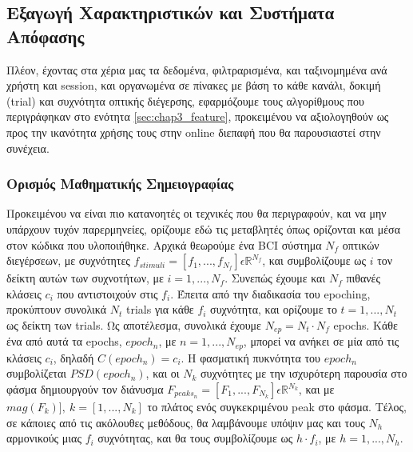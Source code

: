 \documentclass[11pt,a4paper,english,greek,twoside]{../Thesis}
\begin{document}
\subsection{Εξαγωγή Χαρακτηριστικών και Συστήματα Απόφασης}
\label{subsec:featureExtract}
\par Πλέον, έχοντας στα χέρια μας τα δεδομένα, φιλτραρισμένα, και ταξινομημένα ανά χρήστη και session, και οργανωμένα σε πίνακες με βάση το κάθε κανάλι, δοκιμή (trial) και συχνότητα οπτικής διέγερσης, εφαρμόζουμε τους αλγορίθμους που περιγράφηκαν στο ενότητα \ref{sec:chap3_feature}, προκειμένου να αξιολογηθούν ως προς την ικανότητα χρήσης τους στην online διεπαφή που θα παρουσιαστεί στην συνέχεια.

\subsubsection{Ορισμός Μαθηματικής Σημειογραφίας}
\par Προκειμένου να είναι πιο κατανοητές οι τεχνικές που θα περιγραφούν, και να μην υπάρχουν τυχόν παρερμηνείες, ορίζουμε εδώ τις μεταβλητές όπως ορίζονται και μέσα στον κώδικα που υλοποιήθηκε. Αρχικά θεωρούμε ένα BCI σύστημα $N_f$ οπτικών διεγέρσεων, με συχνότητες $f_{stimuli} = [f_1,...,f_{N_f}] \epsilon \mathbb{R}^{N_f}$, και συμβολίζουμε ως $i$ τον δείκτη αυτών των συχνοτήτων, με $i = 1,...,N_f$. Συνεπώς έχουμε και $N_f$ πιθανές κλάσεις $c_i$ που αντιστοιχούν στις $f_i$. Έπειτα από την διαδικασία του epoching, προκύπτουν συνολικά $N_t$ trials για κάθε $f_i$ συχνότητα, και ορίζουμε το $t = 1,...,N_t$ ως δείκτη των trials. Ως αποτέλεσμα, συνολικά έχουμε $N_{ep} = N_t\cdot N_f$ epochs. Κάθε ένα από αυτά τα epochs, $epoch_n$, με $n=1,...,N_{ep}$, μπορεί να ανήκει σε μία από τις κλάσεις $c_i$, δηλαδή $C(epoch_n) = c_i$. Η φασματική πυκνότητα του $epoch_n$ συμβολίζεται $PSD(epoch_n)$, και οι $Ν_k$ συχνότητες με την ισχυρότερη παρουσία στο φάσμα δημιουργούν τον διάνυσμα $F_{peaks_{n}} = [F_1,...,F_{N_k}] \epsilon \mathbb{R}^{N_k}$, και με $mag(F_k)], \  k = [1,...,N_k]$ το πλάτος ενός συγκεκριμένου peak στο φάσμα. Τέλος, σε κάποιες από τις ακόλουθες μεθόδους, θα λαμβάνουμε υπόψιν μας και τους $N_h$ αρμονικούς μιας $f_i$ συχνότητας, και θα τους συμβολίζουμε ως $h\cdot f_i$, με $h=1,...,N_h$.
\end{document}
